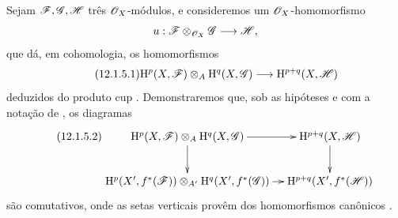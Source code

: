 \begin{env}[12.1.5]
\label{0.12.1.5}
Sejam $\mathscr{F},\mathscr{G},\mathscr{H}$ três $\mathscr{O}_X$-módulos, e consideremos
um $\mathscr{O}_X$-homomorfismo
\[
  u:\mathscr{F}\otimes_{\mathscr{O}_X}\mathscr{G}\longrightarrow\mathscr{H},
\]
que dá, em cohomologia, os homomorfismos
\[
\label{0.12.1.5.1}
\tag{12.1.5.1}
  \HH^p(X,\sh{F})\otimes_A\HH^q(X,\sh{G})
  \longrightarrow
  \HH^{p+q}(X,\sh{H})
\]
deduzidos do produto cup .
Demonstraremos que, sob as hipóteses e com a notação de
, os diagramas
\[
\label{0.12.1.5.2}
\tag{12.1.5.2}
  \xymatrix@C=10pt{
    \HH^p(X,\sh{F})\otimes_A\HH^q(X,\sh{G})
      \ar[r]\ar[d]
      & \HH^{p+q}(X,\sh{H})\ar[d]\\
    \HH^p(X',f^*(\sh{F}))\otimes_{A'}
      \HH^q(X',f^*(\sh{G}))
      \ar[r]
      & \HH^{p+q}(X',f^*(\sh{H}))
  }
\]
são comutativos, onde as setas verticais provêm dos
homomorfismos canônicos .


\end{env}
